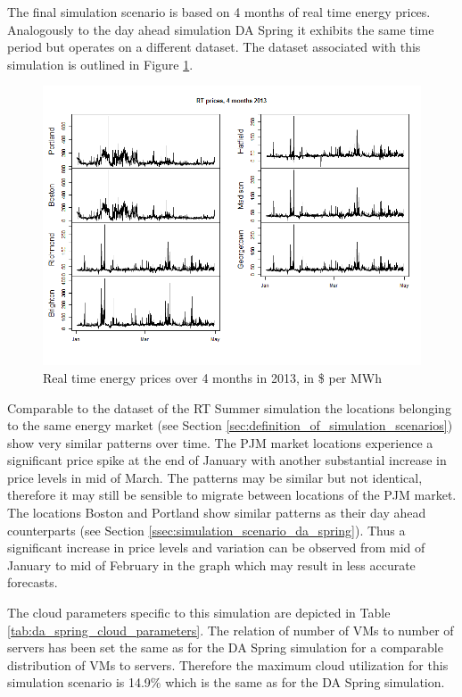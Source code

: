 The final simulation scenario is based on 4 months of real time energy prices. Analogously to the day ahead simulation DA Spring it exhibits the same time period but operates on a different dataset. The dataset associated with this simulation is outlined in Figure \ref{fig:rt_sim_2013_4months}. 

\begin{figure}[htbp]
	\centering
		\includegraphics[width=1.00\textwidth]{figures/evaluation_and_results/rt_sim_2013_4months.png}
	\caption{Real time energy prices over 4 months in 2013, in \$ per MWh}
	\label{fig:rt_sim_2013_4months}
\end{figure}

Comparable to the dataset of the RT Summer simulation the locations belonging to the same energy market (see Section \ref{sec:definition_of_simulation_scenarios}) show very similar patterns over time. The PJM market locations experience a significant price spike at the end of January with another substantial increase in price levels in mid of March. The patterns may be similar but not identical, therefore it may still be sensible to migrate between locations of the PJM market. The locations Boston and Portland show similar patterns as their day ahead counterparts (see Section \ref{ssec:simulation_scenario_da_spring}). Thus a significant increase in price levels and variation can be observed from mid of January to mid of February in the graph which may result in less accurate forecasts. 

The cloud parameters specific to this simulation are depicted in Table \ref{tab:da_spring_cloud_parameters}. The relation of number of VMs to number of servers has been set the same as for the DA Spring simulation for a comparable distribution of VMs to servers. Therefore the maximum cloud utilization for this simulation scenario is 14.9\% which is the same as for the DA Spring simulation. 

